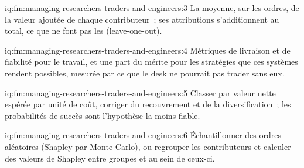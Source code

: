 \begin{solution}{iq:fm:managing-researchers-traders-and-engineers:3}
La moyenne, sur les ordres, de la valeur ajoutée de chaque contributeur~; ses attributions s'additionnent au total, ce que ne font pas les  (leave-one-out).
\end{solution}

\begin{solution}{iq:fm:managing-researchers-traders-and-engineers:4}
Métriques de livraison et de fiabilité pour le travail, et une part du mérite pour les stratégies que ces systèmes rendent possibles, mesurée par ce que le desk
ne pourrait pas trader sans eux.
\end{solution}

\begin{solution}{iq:fm:managing-researchers-traders-and-engineers:5}
Classer par valeur nette espérée par unité de coût, corriger du recouvrement et de la diversification~; les probabilités de succès sont l'hypothèse la moins fiable.
\end{solution}

\begin{solution}{iq:fm:managing-researchers-traders-and-engineers:6}
Échantillonner des ordres aléatoires (Shapley par Monte-Carlo), ou regrouper les contributeurs et calculer des valeurs de Shapley entre groupes et au sein de ceux-ci.
\end{solution}
